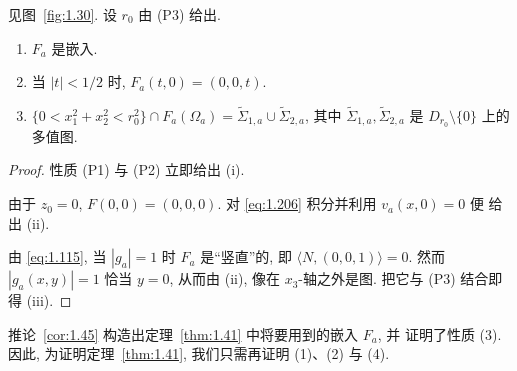 
\begin{corollary}
\label{cor:1.45}
见图~\ref{fig:1.30}. 设 $r_0$ 由 (P3) 给出.
\begin{enumerate}[label=(\roman*)]
  \item $F_a$ 是嵌入.
  \item 当 $|t|<1/2$ 时, $F_a(t,0)=(0,0,t)$.
  \item $\{0<x_1^{2}+x_2^{2}<r_0^{2}\}\cap F_a(\Omega_a)
   =\tilde\Sigma_{1,a}\cup\tilde\Sigma_{2,a}$, 其中
   $\tilde\Sigma_{1,a},\tilde\Sigma_{2,a}$ 是 $D_{r_0}\setminus\{0\}$ 上的
   多值图.
\end{enumerate}
\end{corollary}

\begin{proof}
性质 (P1) 与 (P2) 立即给出 (i).

由于 $z_0=0$, $F(0,0)=(0,0,0)$. 对 \eqref{eq:1.206} 积分并利用 $v_a(x,0)=0$ 便
给出 (ii).

由 \eqref{eq:1.115}, 当 $|g_a|=1$ 时 $F_a$ 是``竖直''的, 即
$\langle N,(0,0,1)\rangle=0$. 然而 $|g_a(x,y)|=1$ 恰当 $y=0$, 从而由
(ii), 像在 $x_3$-轴之外是图. 把它与 (P3) 结合即得 (iii).
\end{proof}

推论~\ref{cor:1.45} 构造出定理~\ref{thm:1.41} 中将要用到的嵌入 $F_a$, 并
证明了性质 (3). 因此, 为证明定理~\ref{thm:1.41}, 我们只需再证明
(1)、(2) 与 (4).


